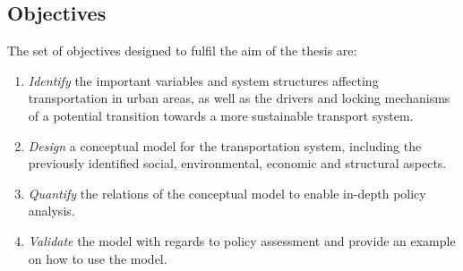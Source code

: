 \documentclass[a4paper,fontsize=10pt,bibliography=totoc]{scrartcl}
\begin{document}
\begin{multicols}{2}
\subsection*{Objectives}
The set of objectives designed to fulfil the aim of the thesis are:
\begin{enumerate}[label=(\alph*)]
	\item \textit{Identify} the important variables and system structures affecting transportation in urban areas, as well as the drivers and locking mechanisms of a potential transition towards a more sustainable transport system.
	\item \textit{Design} a conceptual model for the transportation system, including the previously identified social, environmental, economic and structural aspects.
	\item \textit{Quantify} the relations of the conceptual model to enable in-depth policy analysis.
	\item \textit{Validate} the model with regards to policy assessment and provide an example on how to use the model.
\end{enumerate}


\end{multicols}
\end{document}
